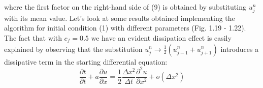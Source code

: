 \documentclass[11pt,a4paper]{article}
\begin{document}
\begin{figure}[!h]
\end{figure}\\
where the first factor on the right-hand side of (9) is obtained by substituting $u_j^n$ with its mean value. Let's look at some results obtained implementing the algorithm for initial condition (1) with different parameters (Fig. 1.19 - 1.22). The fact that with $c_f=0.5$ we have an evident dissipation effect is easily explained by observing that the substitution $u_j^n \to \frac{1}{2} (u_{j-1}^n + u_{j+1}^n)$ introduces a dissipative term in the starting differential equation:
\begin{equation}
\frac{\partial t}{\partial t} + a \frac{\partial u}{\partial x} = \frac{1}{2} \frac{\Delta x^2}{\Delta t} \frac{\partial^2 u}{\partial x^2} + o(\Delta x^2)
\end{equation}
\end{document}
